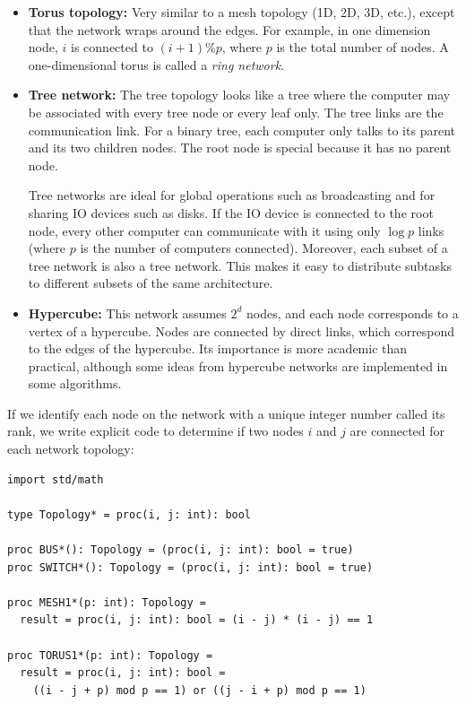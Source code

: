 \documentclass[justified, sixbynine]{tufte-book}
\def\ft{\small\tt}
\theoremstyle{plain}%
\newtheorem * {corollary}{Corollary}
\theoremstyle{definition}
\theoremstyle{remark}
\newtheorem * {remark}{Remark}
\newtheorem * {note}{Note}
\begin{document}
\begin{fullwidth}
\begin{itemize}
\item {\bf Torus topology:}
Very similar to a mesh topology (1D, 2D, 3D, etc.), except that the network wraps around the edges. For example, in one dimension node, $i$ is connected to $(i+1) \% p$, where $p$ is the total number of nodes. A one-dimensional torus is called a {\it ring network}.
\item {\bf Tree network:}
The tree topology looks like a tree where the computer may be associated with every tree node or every leaf only. The tree links are the communication link. For a binary tree, each computer only talks to its parent and its two children nodes. The root node is special because it has no parent node.

Tree networks are ideal for global operations such as broadcasting and for sharing IO devices such as disks. If the IO device is connected to the root node, every other computer can communicate with it using only $\log p$ links (where $p$ is the number of computers connected). Moreover, each subset of a tree network is also a tree network. This makes it easy to distribute subtasks to different subsets of the same architecture.

\item{\bf Hypercube:}
This network assumes $2^d$ nodes, and each node corresponds to a vertex of a hypercube. Nodes are connected by direct links, which correspond to the edges of the hypercube. Its importance is more academic than practical, although some ideas from hypercube networks are implemented in some algorithms.
\end{itemize}

If we identify each node on the network with a unique integer number called its rank, we write explicit code to determine if two nodes $i$ and $j$ are connected for each network topology:


\begin{lstlisting}[caption={in file: {\ft psim.nim}}]
import std/math

type Topology* = proc(i, j: int): bool

proc BUS*(): Topology = (proc(i, j: int): bool = true)
proc SWITCH*(): Topology = (proc(i, j: int): bool = true)

proc MESH1*(p: int): Topology =
  result = proc(i, j: int): bool = (i - j) * (i - j) == 1

proc TORUS1*(p: int): Topology =
  result = proc(i, j: int): bool =
    ((i - j + p) mod p == 1) or ((j - i + p) mod p == 1)


\end{lstlisting}
\end{fullwidth}
\end{document}
